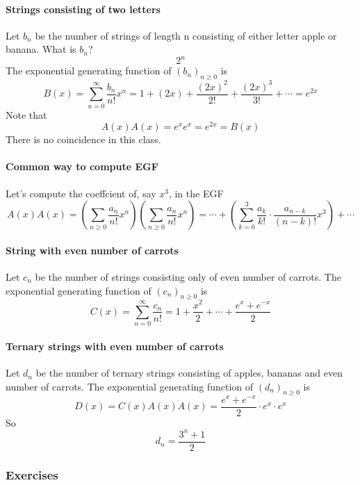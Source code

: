 \documentclass{article}
\begin{document}
\paragraph{Strings consisting of two letters}
Let $b_n$ be the number of strings of length n consisting of either letter apple or banana.\newline
What is $b_n$?
$$2^n$$
The exponential generating function of $(b_n)_{n\ge 0}$ is $$B(x)=\sum_{n=0}^{\infty}\frac{b_n}{n!}x^n=1+(2x)+\frac{(2x)^2}{2!}+\frac{(2x)^3}{3!}+\cdots =e^{2x}$$
Note that 
$$A(x)A(x)=e^xe^x=e^{2x}=B(x)$$
There is no coincidence in this class.
\paragraph{Common way to compute EGF}
Let’s compute the coeffcient of, say $x^3$, in the EGF $$A(x)A(x)=(\sum_{n\ge 0}\frac{a_n}{n!}x^n)(\sum_{n\ge 0}\frac{a_n}{n!}x^n)=\cdots+(\sum_{k=0}^3\frac{a_k}{k!}\cdot \frac{a_{n-k}}{(n-k)!}x^3)+\cdots $$
\paragraph{String with even number of carrots}
Let $c_n$ be the number of strings consisting only of even number of carrots.\newline
The exponential generating function of $(c_n)_{n\ge 0}$ is 
$$C(x)=\sum_{n=0}^{\infty}\frac{c_n}{n!}=1+\frac{x^2}{2}+\cdots +\frac{e^x+e^{-x}}{2}$$
\paragraph{Ternary strings with even number of carrots}
Let $d_n$ be the number of ternary strings consisting of apples, bananas and even number of carrots.\newline
The exponential generating function of $(d_n)_{n\ge 0}$ is $$D(x)=C(x)A(x)A(x)=\frac{e^x+e^{-x}}{2}\cdot e^x\cdot e^x$$
So $$d_n=\frac{3^n+1}{2}$$
\subsubsection{Exercises}
\end{document}
